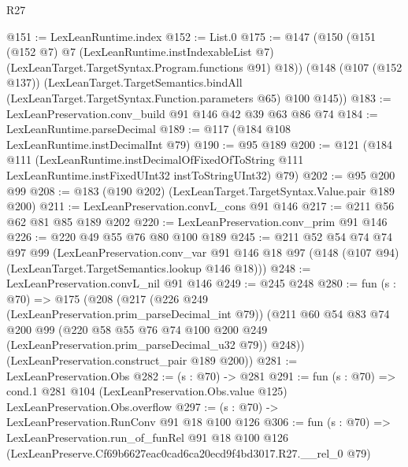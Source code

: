 \begin{lexlean}{R27}
\begin{coremodule}
@151 := LexLeanRuntime.index
@152 := List.{0}
@175 := @147
    (@150
      (@151
        (@152 @7)
        @7
        (LexLeanRuntime.instIndexableList @7)
        (LexLeanTarget.TargetSyntax.Program.functions @91)
        @18))
    (@148
      (@107 (@152 @137))
      (LexLeanTarget.TargetSemantics.bindAll
        (LexLeanTarget.TargetSyntax.Function.parameters @65)
        @100
        @145))
@183 := LexLeanPreservation.conv_build @91 @146 @42 @39 @63 @86 @74
@184 := LexLeanRuntime.parseDecimal
@189 := @117 (@184 @108 LexLeanRuntime.instDecimalInt @79)
@190 := @95 @189
@200 := @121
    (@184
      @111
      (LexLeanRuntime.instDecimalOfFixedOfToString
        @111
        LexLeanRuntime.instFixedUInt32
        instToStringUInt32)
      @79)
@202 := @95 @200 @99
@208 := @183 (@190 @202) (LexLeanTarget.TargetSyntax.Value.pair @189 @200)
@211 := LexLeanPreservation.convL_cons @91 @146
@217 := @211 @56 @62 @81 @85 @189 @202
@220 := LexLeanPreservation.conv_prim @91 @146
@226 := @220 @49 @55 @76 @80 @100 @189
@245 := @211
    @52
    @54
    @74
    @74
    @97
    @99
    (LexLeanPreservation.conv_var
      @91
      @146
      @18
      @97
      (@148 (@107 @94) (LexLeanTarget.TargetSemantics.lookup @146 @18)))
@248 := LexLeanPreservation.convL_nil @91 @146
@249 := @245 @248
@280 := fun (s : @70) =>
  @175
    (@208
      (@217
        (@226 @249 (LexLeanPreservation.prim_parseDecimal_int @79))
        (@211
          @60
          @54
          @83
          @74
          @200
          @99
          (@220 @58 @55 @76 @74 @100 @200 @249 (LexLeanPreservation.prim_parseDecimal_u32 @79))
          @248))
      (LexLeanPreservation.construct_pair @189 @200))
@281 := LexLeanPreservation.Obs
@282 := (s : @70) -> @281
@291 := fun (s : @70) =>
  cond.{1} @281 @104 (LexLeanPreservation.Obs.value @125) LexLeanPreservation.Obs.overflow
@297 := (s : @70) -> LexLeanPreservation.RunConv @91 @18 @100 @126
@306 := fun (s : @70) =>
  LexLeanPreservation.run_of_funRel
    @91
    @18
    @100
    @126
    (LexLeanPreserve.Cf69b6627eac0cad6ca20ecd9f4bd3017.R27.__rel_0 @79)
\end{coremodule}
\end{lexlean}
